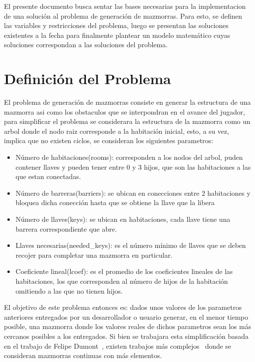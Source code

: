 \documentclass[letter, 10pt]{article}
\begin{document}
El presente documento busca sentar las bases necesarias para la implementacion de una soluci\'on al problema de generaci\'on de mazmorras. Para esto, se definen las variables y restricciones del problema, luego se presentan las soluciones existentes a la fecha para finalmente plantear un modelo matem\'atico cuyas soluciones correspondan a las soluciones del problema.

\section{Definici\'on del Problema}

El problema de generaci\'on de mazmorras consiste en generar la estructura de una mazmorra asi como los obstaculos que se interpondran en el avance del jugador, para simplificar el problema se considerara la estructura de la mazmorra como un arbol donde el nodo raiz corresponde a la habitaci\'on inicial, esto, a su vez, implica que no existen ciclos, se consideran los siguientes parametros:
\begin{itemize}
    \item N\'umero de habitaciones(rooms): corresponden a los nodos del arbol, puden contener llaves y pueden tener entre 0 y 3 hijos, que son las habitaciones a las que estan conectadas.
    \item N\'umero de barreras(barriers): se ubican en conecciones entre 2 habitaciones y bloquea dicha conecci\'on hasta que se obtiene la llave que la libera
    \item N\'umero de llaves(keys): se ubican en habitaciones, cada llave tiene una barrera correspondiente que abre.
    \item Llaves necesarias(needed\_keys): es el n\'umero m\'inimo de llaves que se deben recojer para completar una mazmorra en particular.
    \item Coeficiente lineal(lcoef): es el promedio de los coeficientes lineales de las habitaciones, los que corresponden al n\'umero de hijos de la habitaci\'on omitiendo a las que no tienen hijos.
\end{itemize}
El objetivo de este problema entonces es: dados unos valores de los parametros anteriores entregados por un desarrollador o usuario generar, en el menor tiempo posible, una mazmorra  donde los valores reales de dichos parametros sean los m\'as cercanos posibles a los entregados. 
Si bien se trabajara esta simplificaci\'on basada en el trabajo de Felipe Dumont~\cite{2stepEA}, existen trabajos m\'as complejos~\cite{dgm} donde se consideran mazmorras continuas con m\'as elementos.
\end{document}
